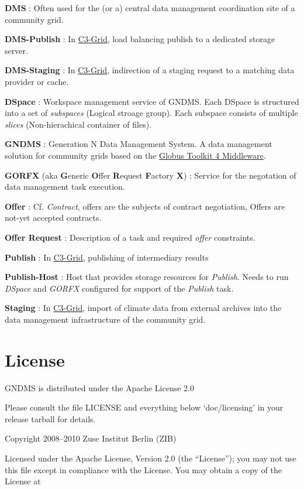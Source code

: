 \documentclass{article}
\begin{document}
\textbf{DMS} : Often used for the (or a) central data management
coordination site of a community grid.

\textbf{DMS-Publish} : In \href{http://www.c3grid.de}{C3-Grid},
load balancing publish to a dedicated storage server.

\textbf{DMS-Staging} : In \href{http://www.c3grid.de}{C3-Grid},
indirection of a staging request to a matching data provider or
cache.

\textbf{DSpace} : Workspace management service of GNDMS. Each
DSpace is structured into a set of \emph{subspaces} (Logical
stroage group). Each subspace consists of multiple \emph{slices}
(Non-hierachical container of files).

\textbf{GNDMS} : Generation N Data Management System. A data
management solution for community grids based on the
\href{http://www.globus.orrg}{Globus Toolkit 4 Middleware}.

\textbf{GORFX} (aka \textbf{G}eneric \textbf{O}ffer
\textbf{R}equest \textbf{F}actory \textbf{X}) : Service for the
negotation of data management task execution.

\textbf{Offer} : Cf. \emph{Contract}, offers are the subjects of
contract negotiation, Offers are not-yet accepted contracts.

\textbf{Offer Request} : Description of a task and required
\emph{offer} constraints.

\textbf{Publish} : In \href{http://www.c3grid.de}{C3-Grid},
publishing of intermediary results

\textbf{Publish-Host} : Host that provides storage resources for
\emph{Publish}. Needs to run \emph{DSpace} and \emph{GORFX}
configured for support of the \emph{Publish} task.

\textbf{Staging} : In \href{http://www.c3grid.de}{C3-Grid}, import
of climate data from external archives into the data management
infrastructure of the community grid.


\section{License}

GNDMS is distributed under the Apache License 2.0

Please consult the file LICENSE and everything below
`doc/licensing' in your release tarball for details.

Copyright 2008--2010 Zuse Institut Berlin (ZIB)

Licensed under the Apache License, Version 2.0 (the ``License'');
you may not use this file except in compliance with the License.
You may obtain a copy of the License at
\end{document}
